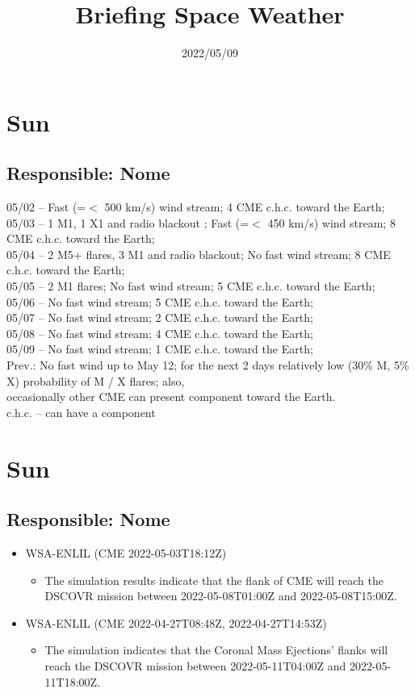 \documentclass[a4paper, 10pt]{article}
\title{\Large{\textbf{Briefing Space Weather}}}
\date{2022/05/09}
\begin{document}
\maketitle 

  \thispagestyle{fancy} \section{Sun} 
 \subsection{Responsible: Nome}

05/02 – Fast (=$<$ 500 km/s) wind stream; 4 CME c.h.c. toward the Earth; \\ 05/03 – 1 M1, 1 X1 and radio blackout ; Fast (=$<$ 450 km/s) wind stream; 8 CME c.h.c. toward the Earth; \\ 05/04 – 2 M5+ flares, 3 M1 and radio blackout; No fast wind stream; 8 CME c.h.c. toward the Earth; \\ 05/05 – 2 M1 flares; No fast wind stream; 5 CME c.h.c. toward the Earth; \\ 05/06 – No fast wind stream; 5 CME c.h.c. toward the Earth; \\ 05/07 – No fast wind stream; 2 CME c.h.c. toward the Earth; \\ 05/08 – No fast wind stream; 4 CME c.h.c. toward the Earth; \\ 05/09 – No fast wind stream; 1 CME c.h.c. toward the Earth; \\ Prev.: No fast wind up to May 12; for the next 2 days relatively low (30\% M, 5\% X) probability of M / X flares; also, \\ occasionally other CME can present component toward the Earth. \\ c.h.c. – can have a component\section{Sun} 
 \subsection{Responsible: Nome}

\begin{itemize} 
 \item WSA-ENLIL (CME 2022-05-03T18:12Z)
\begin{itemize} 
 \item The simulation results indicate that the flank of CME will reach the DSCOVR mission between 2022-05-08T01:00Z and 2022-05-08T15:00Z.
\end{itemize} 
 \item WSA-ENLIL (CME 2022-04-27T08:48Z, 2022-04-27T14:53Z)
\begin{itemize} 
 \item The simulation indicates that the Coronal Mass Ejections’ flanks will reach the DSCOVR mission between 2022-05-11T04:00Z and 2022-05-11T18:00Z. 
\end{itemize} 
 \end{itemize} 
 
\end{document}
